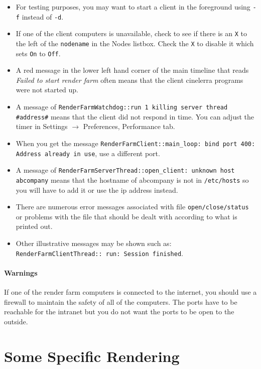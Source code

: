 \begin{itemize}
    \item For testing purposes, you may want to start a client in the foreground using \texttt{-f} instead of \texttt{-d}.
    \item If one of the client computers is unavailable, check to see if there is an \texttt{X} to the left of the \texttt{nodename}
    in the Nodes listbox.  Check the \texttt{X} to disable it which sets \texttt{On} to \texttt{Off}.
    \item A red message in the lower left hand corner of the main timeline that reads \textit{Failed to start render
    farm} often means that the client cinelerra programs were not started up.
    \item A message of \texttt{RenderFarmWatchdog::run 1 killing server thread \\ \#address\#} means that the client did
    not respond in time.  You can adjust the timer in Settings $\rightarrow$ Preferences, Performance tab.
    \item When you get the message \texttt{RenderFarmClient::main\_loop: bind port 400: Address already in use}, use a different port.
    \item A message of \texttt{RenderFarmServerThread::open\_client: unknown host abcompany} means that the
    hostname of abcompany is not in \texttt{/etc/hosts} so you will have to add it or use the ip address instead.
    \item There are numerous error messages associated with file \texttt{open/close/status} or problems with the file
    that should be dealt with according to what is printed out.
    \item Other illustrative messages may be shown such as: \texttt{RenderFarmClientThread:: run: Session finished}.
\end{itemize}

\paragraph{Warnings}

If one of the render farm computers is connected to the internet, you should use a firewall to maintain the safety of all of the computers.  The ports have to be reachable for the intranet but you do not want the ports to be open to the outside.

\section{Some Specific Rendering}%
\label{sec:some_specific_rendering}

